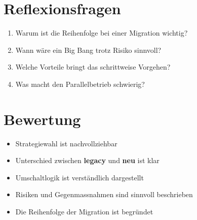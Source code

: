 \documentclass[a4paper,12pt]{article}
\begin{document}
\section*{Reflexionsfragen}

\begin{enumerate}
\item Warum ist die Reihenfolge bei einer Migration wichtig?
\item Wann wäre ein Big Bang trotz Risiko sinnvoll?
\item Welche Vorteile bringt das schrittweise Vorgehen?
\item Was macht den Parallelbetrieb schwierig?
\end{enumerate}

\section*{Bewertung}

\begin{itemize}
\item Strategiewahl ist nachvollziehbar
\item Unterschied zwischen \textbf{legacy} und \textbf{neu} ist klar
\item Umschaltlogik ist verständlich dargestellt
\item Risiken und Gegenmassnahmen sind sinnvoll beschrieben
\item Die Reihenfolge der Migration ist begründet
\end{itemize}
\end{document}
